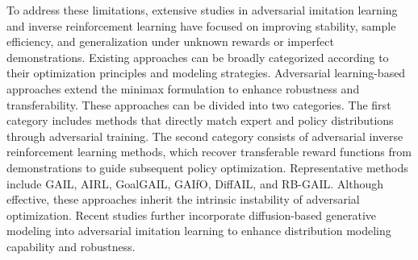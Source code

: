 \documentclass[journal]{IEEEtran}
\begin{document}
To address these limitations, extensive studies in adversarial imitation learning and inverse reinforcement learning have focused on improving stability, sample efficiency, and generalization under unknown rewards or imperfect demonstrations\cite{11232478,finn2016guided,10937085}. Existing approaches can be broadly categorized according to their optimization principles and modeling strategies. Adversarial learning-based approaches extend the minimax formulation to enhance robustness and transferability. These approaches can be divided into two categories. The first category includes methods that directly match expert and policy distributions through adversarial training. The second category consists of adversarial inverse reinforcement learning methods, which recover transferable reward functions from demonstrations to guide subsequent policy optimization. Representative methods include GAIL\cite{ho2016generative}, AIRL\cite{fu2017learning}, GoalGAIL\cite{ding2019goal}, GAIfO\cite{torabi2018generative}, DiffAIL\cite{wang2024diffail}, and RB-GAIL\cite{shi2024ranking}. Although effective, these approaches inherit the intrinsic instability of adversarial optimization. Recent studies further incorporate diffusion-based generative modeling into adversarial imitation learning to enhance distribution modeling capability and robustness\cite{wang2024diffail,chi2025diffusion}.
\end{document}
